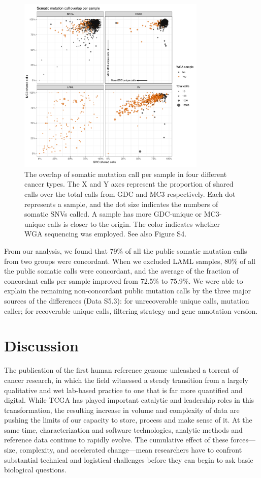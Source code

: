 \begin{figure}[tb]
    \centering
    \includegraphics[width=0.8\textwidth]{figures/chap02_mutation_pipeline_qc/GDC_MC3_overlap_per_sample.pdf}
    \caption[Overlapping somatic mutation calls between GDC and MC3 per sample.]{The overlap of somatic mutation call per sample in four different cancer types. The X and Y axes represent the proportion of shared calls over the total calls from GDC and MC3 respectively. Each dot represents a sample, and the dot size indicates the numbers of somatic SNVs called. A sample has more GDC-unique or MC3-unique calls is closer to the origin. The color indicates whether WGA sequencing was employed. See also Figure S4.}
    \label{fig:mut-call-qc-overlap}
\end{figure}

From our analysis, we found that 79\% of all the public somatic mutation calls from two groups were concordant. When we excluded LAML samples, 80\% of all the public somatic calls were concordant, and the average of the fraction of concordant calls per sample improved from 72.5\% to 75.9\%. We were able to explain the remaining non-concordant public mutation calls by the three major sources of the differences (Data S5.3): for unrecoverable unique calls, mutation caller; for recoverable unique calls, filtering strategy and gene annotation version.


\section{Discussion}
The publication of the first human reference genome unleashed a torrent of cancer research, in which the field witnessed a steady transition from a largely qualitative and wet lab-based practice to one that is far more quantified and digital. While TCGA has played important catalytic and leadership roles in this transformation, the resulting increase in volume and complexity of data are pushing the limits of our capacity to store, process and make sense of it. At the same time, characterization and software technologies, analytic methods and reference data continue to rapidly evolve. The cumulative effect of these forces---size, complexity, and accelerated change---mean researchers have to confront substantial technical and logistical challenges before they can begin to ask basic biological questions.


